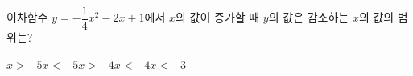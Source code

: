 \hspace*{2mm}\begin{minipage}[t]{\dimexpr\linewidth-2mm\relax}\vspace{0pt}
이차함수 $y=-\dfrac{1}{4}x^2-2x+1$에서 $x$의 값이 증가할 때 $y$의 값은 감소하는 $x$의 값의 범위는?
\begin{choices32}{$x>-5$}{$x<-5$}{$x>-4$}{$x<-4$}{$x<-3$}\end{choices32}\end{minipage}
